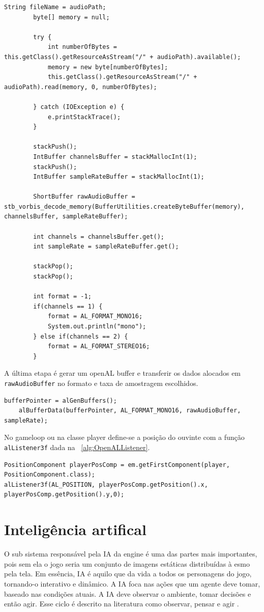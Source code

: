 \documentclass[12pt, 
openright, 
oneside, 
a4paper,    
brazil]{facom-ufu-abntex2}
\begin{document}
\begin{lstlisting}[caption=Leitura do arquivo de aúdio, label={alg:audioReading}]
        String fileName = audioPath;
        byte[] memory = null;
         
        try {
            int numberOfBytes = this.getClass().getResourceAsStream("/" + audioPath).available();
            memory = new byte[numberOfBytes];
            this.getClass().getResourceAsStream("/" + audioPath).read(memory, 0, numberOfBytes);
             
        } catch (IOException e) {
            e.printStackTrace();
        }
 
        stackPush();
        IntBuffer channelsBuffer = stackMallocInt(1);
        stackPush();
        IntBuffer sampleRateBuffer = stackMallocInt(1);

        ShortBuffer rawAudioBuffer = stb_vorbis_decode_memory(BufferUtilities.createByteBuffer(memory), channelsBuffer, sampleRateBuffer);
 
        int channels = channelsBuffer.get();
        int sampleRate = sampleRateBuffer.get();

        stackPop();
        stackPop();
 
        int format = -1;
        if(channels == 1) {
            format = AL_FORMAT_MONO16;
            System.out.println("mono");
        } else if(channels == 2) {
            format = AL_FORMAT_STEREO16;
        }
\end{lstlisting}

A última etapa é gerar um openAL buffer e transferir os dados alocados em \texttt{rawAudioBuffer} no formato e taxa de amostragem escolhidos.
\begin{lstlisting}[caption=OpenAL Buffers]
    bufferPointer = alGenBuffers();
    alBufferData(bufferPointer, AL_FORMAT_MONO16, rawAudioBuffer, sampleRate);
\end{lstlisting}

No gameloop ou na classe player define-se a posição do ouvinte com a função \texttt{alListener3f} dada na \lstlistingname~\ref{alg:OpenALListener}.

\begin{lstlisting}[caption=OpenAL Listener, label={alg:OpenALListener}
]
PositionComponent playerPosComp = em.getFirstComponent(player, PositionComponent.class);
alListener3f(AL_POSITION, playerPosComp.getPosition().x, playerPosComp.getPosition().y,0);
\end{lstlisting}

\chapter{Inteligência artifical}
\label{cap:ia}
O sub sistema responsável pela IA da engine é uma das partes mais importantes, pois sem ela o jogo seria um conjunto de imagens estáticas distribuídas à esmo pela tela.
Em essência, IA é aquilo que da vida a todos os personagens do jogo, tornando-o interativo e dinâmico.
A IA foca nas ações que um agente deve tomar, baseado nas condições atuais. A IA deve observar o ambiente, tomar decisões e então agir. Esse ciclo é descrito na literatura como observar, pensar e agir \cite{GameDevAI}.
\end{document}
